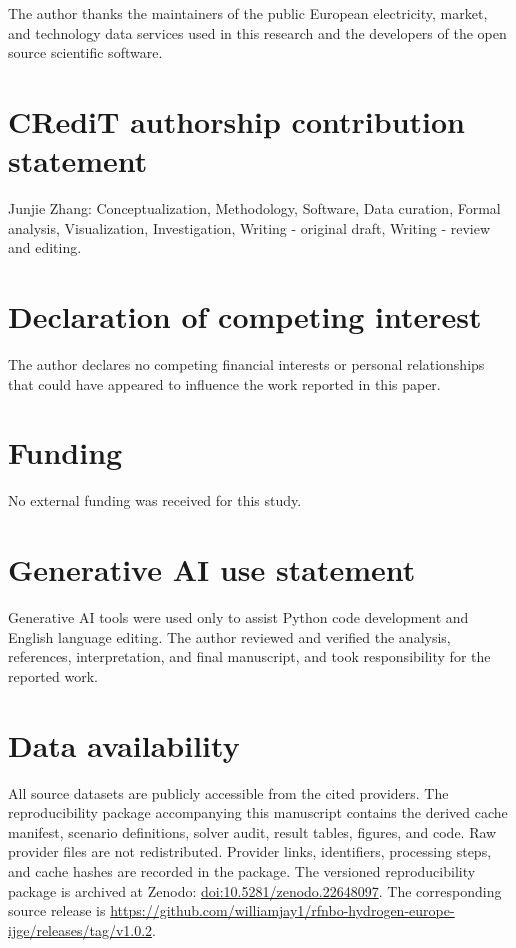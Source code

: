 \documentclass[largeformat]{interact}
\begin{document}
The author thanks the maintainers of the public European electricity,
market, and technology data services used in this research and the
developers of the open source scientific software.

\section*{CRediT authorship contribution statement}

Junjie Zhang: Conceptualization, Methodology, Software, Data curation,
Formal analysis, Visualization, Investigation, Writing - original draft,
Writing - review and editing.

\section*{Declaration of competing interest}

The author declares no competing financial interests or personal
relationships that could have appeared to influence the work reported in
this paper.

\section*{Funding}

No external funding was received for this study.

\section*{Generative AI use statement}

Generative AI tools were used only to assist Python code development and
English language editing. The author reviewed and verified the analysis,
references, interpretation, and final manuscript, and took
responsibility for the reported work.

\section*{Data availability}

All source datasets are publicly accessible from the cited providers.
The reproducibility package accompanying this manuscript contains the
derived cache manifest, scenario definitions, solver audit, result
tables, figures, and code. Raw provider files are not redistributed.
Provider links, identifiers, processing steps, and cache hashes are
recorded in the package. The versioned reproducibility package is archived
at Zenodo: \href{https://doi.org/10.5281/zenodo.22648097}{doi:10.5281/zenodo.22648097}.
The corresponding source release is \url{https://github.com/williamjay1/rfnbo-hydrogen-europe-ijge/releases/tag/v1.0.2}.
\end{document}
